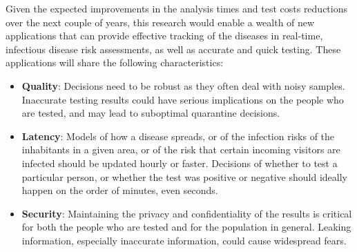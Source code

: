 Given the expected improvements in the analysis times and test costs reductions over the next couple of years, this research would enable a wealth of new applications that can provide effective tracking of the diseases in real-time, infectious disease risk assessments, as well as accurate and quick testing. These applications will share the following characteristics:

\begin{itemize}[noitemsep,topsep=0pt,parsep=0pt,partopsep=0pt]
\item {\bf Quality}: Decisions need to be robust as they often deal with noisy samples. Inaccurate testing results could have serious implications on the people who are tested, and may lead to suboptimal quarantine decisions.  
\item {\bf Latency}: Models of how a disease spreads, or of the infection risks of the inhabitants in a given area, or of the risk that certain incoming visitors are infected should be updated hourly or faster. Decisions of whether to test a particular person, or whether the test was positive or negative should ideally happen on the order of minutes, even seconds.
\item{\bf Security}: Maintaining the privacy and confidentiality of the results is critical for both the people who are tested and for the population in general. Leaking information, especially inaccurate information, could cause widespread fears.
\end{itemize}

